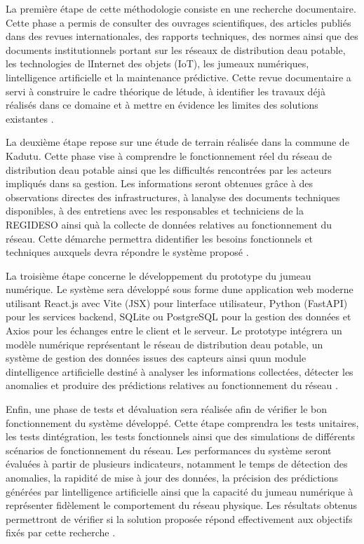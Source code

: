 La première étape de cette méthodologie consiste en une recherche
documentaire. Cette phase a permis de consulter des ouvrages
scientifiques, des articles publiés dans des revues internationales, des
rapports techniques, des normes ainsi que des documents institutionnels
portant sur les réseaux de distribution d\textquotesingle eau potable,
les technologies de l\textquotesingle Internet des objets (IoT), les
jumeaux numériques, l\textquotesingle intelligence artificielle et la
maintenance prédictive. Cette revue documentaire a servi à construire le
cadre théorique de l\textquotesingle étude, à identifier les travaux
déjà réalisés dans ce domaine et à mettre en évidence les limites des
solutions existantes \cite{ref104}.

La deuxième étape repose sur une étude de terrain réalisée dans la
commune de Kadutu. Cette phase vise à comprendre le fonctionnement réel
du réseau de distribution d\textquotesingle eau potable ainsi que les
difficultés rencontrées par les acteurs impliqués dans sa gestion. Les
informations seront obtenues grâce à des observations directes des
infrastructures, à l\textquotesingle analyse des documents techniques
disponibles, à des entretiens avec les responsables et techniciens de la
REGIDESO ainsi qu\textquotesingle à la collecte de données relatives au
fonctionnement du réseau. Cette démarche permettra
d\textquotesingle identifier les besoins fonctionnels et techniques
auxquels devra répondre le système proposé \cite{ref75}.

La troisième étape concerne le développement du prototype du jumeau
numérique. Le système sera développé sous forme d\textquotesingle une
application web moderne utilisant React.js avec Vite (JSX) pour
l\textquotesingle interface utilisateur, Python (FastAPI) pour les
services backend, SQLite ou PostgreSQL pour la gestion des données et
Axios pour les échanges entre le client et le serveur. Le prototype
intégrera un modèle numérique représentant le réseau de distribution
d\textquotesingle eau potable, un système de gestion des données issues
des capteurs ainsi qu\textquotesingle un module
d\textquotesingle intelligence artificielle destiné à analyser les
informations collectées, détecter les anomalies et produire des
prédictions relatives au fonctionnement du réseau \cite{ref106}.

Enfin, une phase de tests et d\textquotesingle évaluation sera réalisée
afin de vérifier le bon fonctionnement du système développé. Cette étape
comprendra les tests unitaires, les tests d\textquotesingle intégration,
les tests fonctionnels ainsi que des simulations de différents scénarios
de fonctionnement du réseau. Les performances du système seront évaluées
à partir de plusieurs indicateurs, notamment le temps de détection des
anomalies, la rapidité de mise à jour des données, la précision des
prédictions générées par l\textquotesingle intelligence artificielle
ainsi que la capacité du jumeau numérique à représenter fidèlement le
comportement du réseau physique. Les résultats obtenus permettront de
vérifier si la solution proposée répond effectivement aux objectifs
fixés par cette recherche \cite{ref107}.

